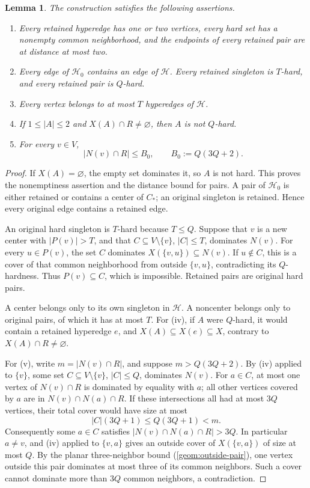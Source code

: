 \documentclass[11pt,a4paper]{article}
\newtheorem{lemma}[lemma]{Lemma}
\theoremstyle{definition}
\theoremstyle{remark}
\newcommand{\HH}{\mathcal H}
\begin{document}
\begin{lemma}\label{lem:hard-properties}
The construction satisfies the following assertions.
\begin{enumerate}[label=(\roman*),itemsep=2pt]
  \item Every retained hyperedge has one or two vertices, every hard set
  has a nonempty common neighborhood, and the endpoints of every retained
  pair are at distance at most two.
  \item Every edge of \(\HH_0\) contains an edge of \(\HH\).
  Every retained singleton is \(T\)-hard, and every retained pair is
  \(Q\)-hard.
  \item Every vertex belongs to at most \(T\) hyperedges of \(\HH\).
  \item If \(1\leq |A|\leq2\) and \(X(A)\cap R\ne\varnothing\),
  then \(A\) is not \(Q\)-hard.
  \item For every \(v\in V\),
  \[
    |N(v)\cap R|\leq B_0,\qquad B_0:=Q(3Q+2).
  \]
\end{enumerate}
\end{lemma}
\begin{proof}
If \(X(A)=\varnothing\), the empty set dominates it, so \(A\) is not
hard. This proves the nonemptiness assertion and the distance bound for
pairs. A pair of \(\HH_0\) is either retained or contains a center of
\(C_*\); an original singleton is retained. Hence every original edge
contains a retained edge.

An original hard singleton is \(T\)-hard because \(T\leq Q\).
Suppose that \(v\) is a new center with \(|P(v)|>T\), and that
\(C\subseteq V\setminus\{v\}\), \(|C|\leq T\), dominates \(N(v)\).
For every \(u\in P(v)\), the set \(C\) dominates
\(X(\{v,u\})\subseteq N(v)\). If \(u\notin C\), this is a cover of that
common neighborhood from outside \(\{v,u\}\), contradicting its
\(Q\)-hardness. Thus \(P(v)\subseteq C\), which is impossible.
Retained pairs are original hard pairs.

A center belongs only to its own singleton in \(\HH\). A noncenter
belongs only to original pairs, of which it has at most \(T\).
For (iv), if \(A\) were \(Q\)-hard, it would contain a retained
hyperedge \(e\), and
\(X(A)\subseteq X(e)\subseteq X\), contrary to
\(X(A)\cap R\ne\varnothing\).

For (v), write \(m=|N(v)\cap R|\), and suppose \(m>Q(3Q+2)\).
By (iv) applied to \(\{v\}\), some set
\(C\subseteq V\setminus\{v\}\), \(|C|\leq Q\), dominates \(N(v)\).
For \(a\in C\), at most one vertex of \(N(v)\cap R\) is dominated by
equality with \(a\); all other vertices covered by \(a\) are in
\(N(v)\cap N(a)\cap R\). If these intersections all had at most \(3Q\)
vertices, their total cover would have size at most
\[
  |C|(3Q+1)\leq Q(3Q+1)<m.
 \]
Consequently some \(a\in C\) satisfies
\(|N(v)\cap N(a)\cap R|>3Q\). In particular \(a\ne v\), and
(iv) applied to \(\{v,a\}\) gives an outside cover of \(X(\{v,a\})\)
of size at most \(Q\). By the planar three-neighbor bound
(\cref{geom:outside-pair}), one vertex outside this pair dominates at most
three of its common neighbors. Such a cover cannot dominate more than
\(3Q\) common neighbors, a contradiction.
\end{proof}
\end{document}
